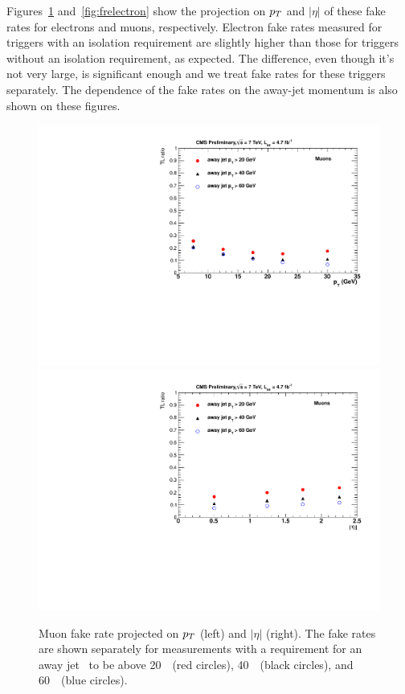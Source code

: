 Figures~\ref{fig:frmuon}  and~\ref{fig:frelectron}  show the projection on $p_T$ and $|\eta|$ of these fake rates
for electrons and muons, respectively.
Electron fake rates measured for triggers with an isolation requirement are slightly higher than those
for triggers without an isolation requirement, as expected.
The difference, even though it's not very large, is significant enough and we treat fake rates for these triggers
separately.
The dependence of the fake rates on the away-jet momentum is also shown on these figures.

\begin{figure}[h]
\begin{center}
\includegraphics[width=0.48\linewidth]{figs/muFR_data_ptProj}
\includegraphics[width=0.48\linewidth]{figs/muFR_data_etaProj}
\caption{\label{fig:frmuon}Muon fake rate projected on $p_T$ (left) and $|\eta|$ (right).
The fake rates are shown separately for measurements  with a requirement for an away jet \pt\ 
to be above 20~\GeV\ (red circles), 40~\GeV\ (black circles), and 60~\GeV\ (blue circles).
}
\end{center}
\end{figure}

